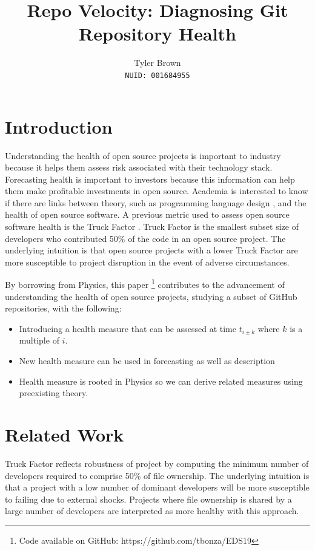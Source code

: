 \documentclass{article}
\title{Repo Velocity: Diagnosing Git Repository Health}
\author{%
  Tyler Brown\\
  \texttt{NUID: 001684955} \\
}
\begin{document}

\maketitle

\section{Introduction}

Understanding the health of open source projects is important to
industry because it helps them assess risk associated with their
technology stack. Forecasting health is important to investors because
this information can help them make profitable investments in open
source. Academia is interested to know if there are links between
theory, such as programming language design \cite{ray2014large}, and the
health of open source software. A previous metric used to assess open source
software health is the Truck Factor \cite{avelino2015truck}. Truck Factor
is the smallest subset size of developers who contributed 50\% of the code
in an open source project. The underlying intuition is that open source
projects with a lower Truck Factor are more susceptible to project disruption
in the event of adverse circumstances.

By borrowing from Physics, this paper
\footnote{Code available on GitHub: https://github.com/tbonza/EDS19}
contributes to the advancement of understanding the health of open source
projects, studying a subset of GitHub repositories, with the following:

\begin{itemize}
\item Introducing a health measure that can be assessed at time
  $t_{i \pm k}$ where $k$ is a multiple of $i$.
\item New health measure can be used in forecasting as well as description
\item Health measure is rooted in Physics so we can derive related measures
  using preexisting theory.
\end{itemize}

\section{Related Work}

Truck Factor reflects robustness of project \cite{avelino2015truck} by
computing the minimum number of developers required to comprise 50\% of
file ownership. The underlying intuition is that a project with a low
number of dominant developers will be more susceptible to failing due
to external shocks. Projects where file ownership is shared by a large
number of developers are interpreted as more healthy with this approach.
\end{document}
